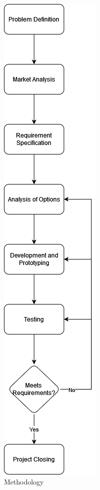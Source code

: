 \begin{figure}[!ht]
    \caption{Methodology}\label{fig:methodology}
    \centering
    \includegraphics[scale=0.40]{project_plan/figures/Methodology}
\end{figure}

